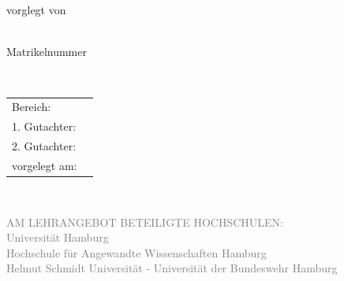 \begin{titlepage}
\begin{minipage}[l][5.0cm][t]{\textwidth}
\begin{center}
		{\Huge
			\textcolor{hwiFarbe}{\thesistype{}} %
		} \\	[\baselineskip]
	

		{\Large %
			\thesistitle			} \\[\baselineskip]
			
		vorglegt von
		
		{\large %

			\student \\
			Matrikelnummer \studentnumber
		} \\
	\end{center}
\end{minipage}



\vfill %

\begin{tabular}{@{}ll}
	Bereich: & \\
	1. Gutachter:  & \firstsupervisor \\	
	2. Gutachter:  & \secondsupervisor \\
	vorgelegt am:  & \thesisdate
\end{tabular} \\[-1.0\baselineskip]

\hspace*{.55\linewidth}\begin{minipage}[t][-0.5cm][t]{\textwidth}%
\raggedright
\scriptsize
\singlespacing
\textcolor{gray}{
    \scriptsize
	AM LEHRANGEBOT BETEILIGTE HOCHSCHULEN:\\
	Universität Hamburg\\
	Hochschule für Angewandte Wissenschaften Hamburg\\
    {%
    }
    {%
        Helmut Schmidt Universität - Universität der Bundeswehr Hamburg\\
    }
}
\end{minipage}
\end{titlepage}

